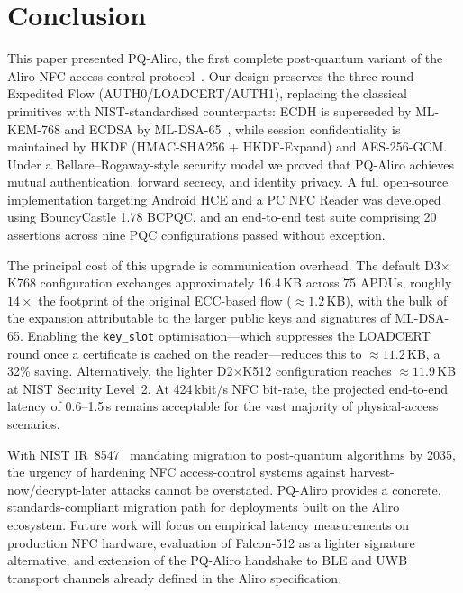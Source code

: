 \section{Conclusion}

This paper presented PQ-Aliro, the first complete post-quantum variant of the Aliro NFC
access-control protocol~\cite{CSA:Aliro10}.
Our design preserves the three-round Expedited Flow (AUTH0/LOADCERT/AUTH1), replacing
the classical primitives with NIST-standardised counterparts: ECDH is superseded by
ML-KEM-768 and ECDSA by ML-DSA-65~\cite{NIST:FIPS203,NIST:FIPS204},
while session confidentiality is maintained by HKDF (HMAC-SHA256 + HKDF-Expand) and
AES-256-GCM.
Under a Bellare--Rogaway-style security model we proved that PQ-Aliro achieves mutual
authentication, forward secrecy, and identity privacy.
A full open-source implementation targeting Android HCE and a PC NFC Reader was
developed using BouncyCastle 1.78 BCPQC, and an end-to-end test suite comprising
20 assertions across nine PQC configurations passed without exception.

The principal cost of this upgrade is communication overhead.
The default D3$\times$K768 configuration exchanges approximately 16.4\,KB across
75 APDUs, roughly $14\times$ the footprint of the original ECC-based flow
(${\approx}1.2$\,KB), with the bulk of the expansion attributable to the larger public
keys and signatures of ML-DSA-65.
Enabling the \texttt{key\_slot} optimisation---which suppresses the LOADCERT round once
a certificate is cached on the reader---reduces this to ${\approx}11.2$\,KB, a 32\%
saving.
Alternatively, the lighter D2$\times$K512 configuration reaches ${\approx}11.9$\,KB at
NIST Security Level~2.
At 424\,kbit/s NFC bit-rate, the projected end-to-end latency of 0.6--1.5\,s remains
acceptable for the vast majority of physical-access scenarios.

With NIST IR~8547~\cite{NIST:IR8547} mandating migration to post-quantum algorithms by
2035, the urgency of hardening NFC access-control systems against harvest-now/decrypt-later
attacks cannot be overstated.
PQ-Aliro provides a concrete, standards-compliant migration path for deployments built on
the Aliro~\cite{CSA:Aliro10} ecosystem.
Future work will focus on empirical latency measurements on production NFC hardware,
evaluation of Falcon-512 as a lighter signature alternative, and extension of the
PQ-Aliro handshake to BLE and UWB transport channels already defined in the Aliro
specification.



